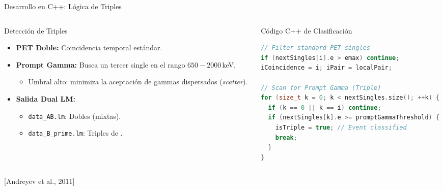 \documentclass[aspectratio=169]{beamer}
\newcommand{\yochoseis}{\ce{^{86}Y}\xspace}
\begin{document}
\begin{frame}[fragile]{Desarrollo en C++: Lógica de Triples}
    \begin{columns}[T]
        \begin{column}{0.48\textwidth}
            \begin{block}{Detección de Triples}
                \begin{itemize}
                    \item \textbf{PET Doble:} Coincidencia temporal estándar.
                    \item \textbf{Prompt Gamma:} Busca un tercer single en el rango $650 - 2000$\,keV.
                          \begin{itemize}
                              \item \scriptsize Umbral alto: minimiza la aceptación de gammas dispersados (\textit{scatter}).
                          \end{itemize}
                    \item \textbf{Salida Dual LM:}
                          \begin{itemize}
                              \item \texttt{data\_AB.lm}: Dobles (mixtas).
                              \item \texttt{data\_B\_prime.lm}: Triples de \yochoseis.
                          \end{itemize}
                \end{itemize}
            \end{block}
        \end{column}
        \begin{column}{0.48\textwidth}
            \begin{block}{Código C++ de Clasificación}
                \begin{lstlisting}[language=C++, basicstyle=\ttfamily\tiny, keywordstyle=\color{blue}, commentstyle=\color{green!60!black}, breaklines=true]
// Filter standard PET singles
if (nextSingles[i].e > emax) continue;
iCoincidence = i; iPair = localPair;

// Scan for Prompt Gamma (Triple)
for (size_t k = 0; k < nextSingles.size(); ++k) {
  if (k == 0 || k == i) continue;
  if (nextSingles[k].e >= promptGammaThreshold) {
    isTriple = true; // Event classified
    break;
  }
}
\end{lstlisting}
            \end{block}
        \end{column}
    \end{columns}
    \vspace{0.1cm}
    \hfill {\tiny\color{mcmBlack!40} [Andreyev et al., 2011]}
\end{frame}
\end{document}
